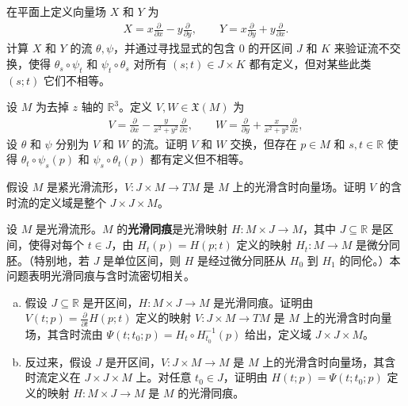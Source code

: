 \documentclass[../../main.tex]{subfiles}
\begin{document}
\begin{exercise}\label{exercise:ch09-18}
在平面上定义向量场 $X$ 和 $Y$ 为
\begin{align*}
X=x\frac{\partial}{\partial x}-y\frac{\partial}{\partial y},\qquad Y=x\frac{\partial}{\partial y}+y\frac{\partial}{\partial x}.
\end{align*}
计算 $X$ 和 $Y$ 的流 $\theta,\psi$，并通过寻找显式的包含 $0$ 的开区间 $J$ 和 $K$ 来验证流不交换，使得 $\theta_s\circ\psi_t$ 和 $\psi_t\circ\theta_s$ 对所有 $(s;t)\in J\times K$ 都有定义，但对某些此类 $(s;t)$ 它们不相等。
\end{exercise}

\begin{exercise}\label{exercise:ch09-19}
设 $M$ 为去掉 $z$ 轴的 $\mathbb{R}^3$。定义 $V,W\in\mathfrak{X}(M)$ 为
\begin{align*}
V=\frac{\partial}{\partial x}-\frac{y}{x^2+y^2}\frac{\partial}{\partial z},\qquad W=\frac{\partial}{\partial y}+\frac{x}{x^2+y^2}\frac{\partial}{\partial z},
\end{align*}
设 $\theta$ 和 $\psi$ 分别为 $V$ 和 $W$ 的流。证明 $V$ 和 $W$ 交换，但存在 $p\in M$ 和 $s,t\in\mathbb{R}$ 使得 $\theta_t\circ\psi_s(p)$ 和 $\psi_s\circ\theta_t(p)$ 都有定义但不相等。
\end{exercise}

\begin{exercise}\label{exercise:ch09-20}
假设 $M$ 是紧光滑流形，$V\colon J\times M\to TM$ 是 $M$ 上的光滑含时向量场。证明 $V$ 的含时流的定义域是整个 $J\times J\times M$。
\end{exercise}

\begin{exercise}\label{exercise:ch09-21}
设 $M$ 是光滑流形。$M$ 的\textbf{光滑同痕}是光滑映射 $H\colon M\times J\to M$，其中 $J\subseteq\mathbb{R}$ 是区间，使得对每个 $t\in J$，由 $H_t(p)=H(p;t)$ 定义的映射 $H_t\colon M\to M$ 是微分同胚。（特别地，若 $J$ 是单位区间，则 $H$ 是经过微分同胚从 $H_0$ 到 $H_1$ 的同伦。）本问题表明光滑同痕与含时流密切相关。
\begin{enumerate}[(a)]
\item 假设 $J\subseteq\mathbb{R}$ 是开区间，$H\colon M\times J\to M$ 是光滑同痕。证明由 $V(t;p)=\frac{\partial}{\partial t}H(p;t)$ 定义的映射 $V\colon J\times M\to TM$ 是 $M$ 上的光滑含时向量场，其含时流由 $\Psi(t;t_0;p)=H_t\circ H_{t_0}^{-1}(p)$ 给出，定义域 $J\times J\times M$。
\item 反过来，假设 $J$ 是开区间，$V\colon J\times M\to M$ 是 $M$ 上的光滑含时向量场，其含时流定义在 $J\times J\times M$ 上。对任意 $t_0\in J$，证明由 $H(t;p)=\Psi(t;t_0;p)$ 定义的映射 $H\colon M\times J\to M$ 是 $M$ 的光滑同痕。
\end{enumerate}
\end{exercise}
\end{document}
